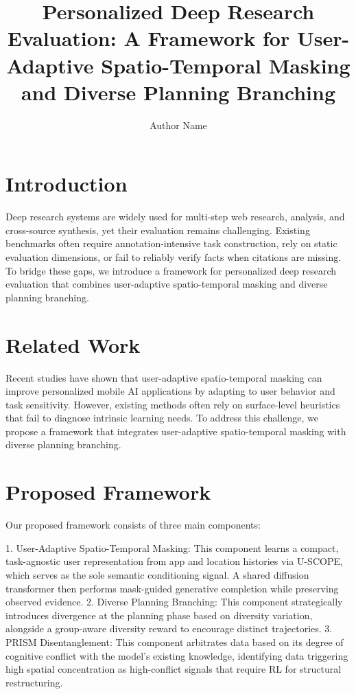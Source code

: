 \documentclass{article}
\begin{document}
\title{Personalized Deep Research Evaluation: A Framework for User-Adaptive Spatio-Temporal Masking and Diverse Planning Branching}

\author{Author Name}

\maketitle

\section{Introduction}

Deep research systems are widely used for multi-step web research, analysis, and cross-source synthesis, yet their evaluation remains challenging. Existing benchmarks often require annotation-intensive task construction, rely on static evaluation dimensions, or fail to reliably verify facts when citations are missing. To bridge these gaps, we introduce a framework for personalized deep research evaluation that combines user-adaptive spatio-temporal masking and diverse planning branching.

\section{Related Work}

Recent studies have shown that user-adaptive spatio-temporal masking can improve personalized mobile AI applications by adapting to user behavior and task sensitivity. However, existing methods often rely on surface-level heuristics that fail to diagnose intrinsic learning needs. To address this challenge, we propose a framework that integrates user-adaptive spatio-temporal masking with diverse planning branching.

\section{Proposed Framework}

Our proposed framework consists of three main components:

1. User-Adaptive Spatio-Temporal Masking: This component learns a compact, task-agnostic user representation from app and location histories via U-SCOPE, which serves as the sole semantic conditioning signal. A shared diffusion transformer then performs mask-guided generative completion while preserving observed evidence.
2. Diverse Planning Branching: This component strategically introduces divergence at the planning phase based on diversity variation, alongside a group-aware diversity reward to encourage distinct trajectories.
3. PRISM Disentanglement: This component arbitrates data based on its degree of cognitive conflict with the model's existing knowledge, identifying data triggering high spatial concentration as high-conflict signals that require RL for structural restructuring.
\end{document}
